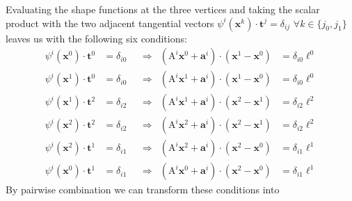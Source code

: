 \documentclass{scrartcl}
\begin{document}
Evaluating the shape functions at the three vertices and taking the scalar
product with the two adjacent tangential vectors $\psi^i(\mathbf
x^k)\cdot\mathbf t^j=\delta_{ij}$ $\forall k\in\{j_0,j_1\}$ leaves us with
the following six conditions:
\begin{subequations}
  \begin{align}
    \label{cond:x0t0}
    \psi^i(\mathbf x^0)\cdot\mathbf t^0&=\delta_{i0} &&\Longrightarrow &
        (\mathrm A^i\mathbf x^0+\mathbf a^i)
        \cdot(\mathbf x^1-\mathbf x^0)&=\delta_{i0}\ell^0              \\
    \label{cond:x1t0}
    \psi^i(\mathbf x^1)\cdot\mathbf t^0&=\delta_{i0} &&\Longrightarrow &
        (\mathrm A^i\mathbf x^1+\mathbf a^i)
        \cdot(\mathbf x^1-\mathbf x^0)&=\delta_{i0}\ell^0              \\
    \label{cond:x1t2}
    \psi^i(\mathbf x^1)\cdot\mathbf t^2&=\delta_{i2} &&\Longrightarrow &
        (\mathrm A^i\mathbf x^1+\mathbf a^i)
        \cdot(\mathbf x^2-\mathbf x^1)&=\delta_{i2}\ell^2              \\
    \label{cond:x2t2}
    \psi^i(\mathbf x^2)\cdot\mathbf t^2&=\delta_{i2} &&\Longrightarrow &
        (\mathrm A^i\mathbf x^2+\mathbf a^i)
        \cdot(\mathbf x^2-\mathbf x^1)&=\delta_{i2}\ell^2              \\
    \label{cond:x2t1}
    \psi^i(\mathbf x^2)\cdot\mathbf t^1&=\delta_{i1} &&\Longrightarrow &
        (\mathrm A^i\mathbf x^2+\mathbf a^i)
        \cdot(\mathbf x^2-\mathbf x^0)&=\delta_{i1}\ell^1              \\
    \label{cond:x0t1}
    \psi^i(\mathbf x^0)\cdot\mathbf t^1&=\delta_{i1} &&\Longrightarrow &
        (\mathrm A^i\mathbf x^0+\mathbf a^i)
        \cdot(\mathbf x^2-\mathbf x^0)&=\delta_{i1}\ell^1
  \end{align}
\end{subequations}
By pairwise combination we can transform these conditions into
\end{document}
